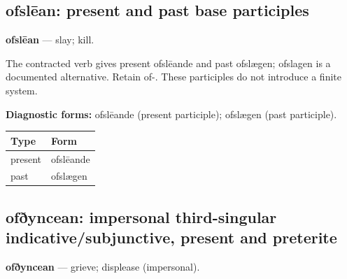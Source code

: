 \subsection*{ofslēan: present and past base participles}

\par\begin{minipage}{\linewidth}\raggedright
\textbf{ofslēan} — slay; kill.

The contracted verb gives present ofslēande and past ofslægen; ofslagen is a documented alternative. Retain of-. These participles do not introduce a finite system.

\textbf{Diagnostic forms:} ofslēande (present participle); ofslægen (past participle).

\par\begingroup
\fontsize{10.5}{13.2}\selectfont
\setlength{\LTleft}{0pt}\setlength{\LTright}{\fill}
\noindent
\begin{tabular}{@{}>{\raggedright\arraybackslash}p{60.59mm}>{\raggedright\arraybackslash}p{60.59mm}@{}}
\toprule
\textbf{Type} & \textbf{Form} \\
\midrule
present & ofslēande \\
past & ofslægen \\
\bottomrule
\end{tabular}
\par\endgroup

\end{minipage}\par
{}
\subsection*{ofðyncean: impersonal third-singular indicative/\allowbreak{}subjunctive, present and preterite}

\textbf{ofðyncean} — grieve; displease (impersonal).

